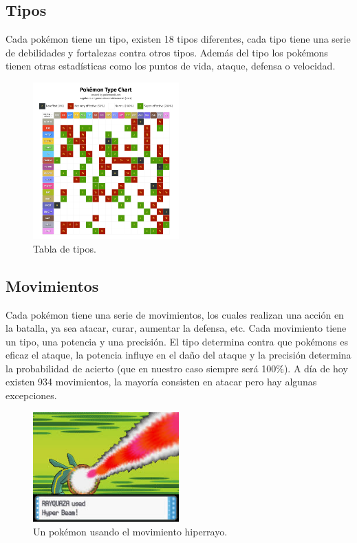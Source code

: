 \subsection{Tipos}
Cada pokémon tiene un tipo, existen 18 tipos diferentes, cada tipo tiene una serie de debilidades y fortalezas contra otros tipos. Además del tipo los pokémons tienen otras estadísticas como los puntos de vida, ataque, defensa o velocidad. 

\begin{figure}[H]
	\centering
	\includegraphics[width=0.5\textwidth]{figures/chart.png}
	\caption{Tabla de tipos.}
	\label{fig:types}
\end{figure}

\subsection{Movimientos}
Cada pokémon tiene una serie de movimientos, los cuales realizan una acción en la batalla, ya sea atacar, curar, aumentar la defensa, etc. Cada movimiento tiene un tipo, una potencia y una precisión. El tipo determina contra que pokémons es eficaz el ataque, la potencia influye en el daño del ataque y la precisión determina la probabilidad de acierto (que en nuestro caso siempre será 100\%). A día de hoy existen 934 movimientos, la mayoría consisten en atacar pero hay algunas excepciones.

\begin{figure}[H]
	\centering
	\includegraphics[width=0.5\textwidth]{figures/hiperrayo.jpg}
	\caption{Un pokémon usando el movimiento hiperrayo.}
	\label{fig:hiperrayo}
\end{figure}

